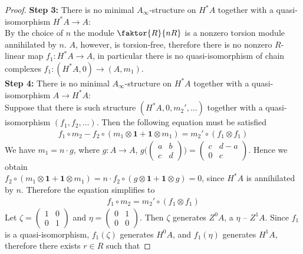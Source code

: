 \documentclass[a4paper, 12pt, openany, fleqn]{amsart}
\begin{document}
\begin{proof}
    \smallskip
    \textbf{Step 3:} There is no minimal $A_\infty$-structure on $H^*A$ together with a quasi-isomorphism $H^*A\longrightarrow A$:\\
    By the choice of $n$ the module $\faktor{R}{nR}$ is a nonzero torsion module annihilated by $n$. $A$, however, is torsion-free, therefore there is no nonzero $R$-linear map $f_1:H^*A\longrightarrow A$, in particular there is no quasi-isomorphism of chain complexes $f_1:(H^*A,0)\longrightarrow (A, m_1)$.\\

    \smallskip
    \textbf{Step 4:} There is no minimal $A_\infty$-structure on $H^*A$ together with a quasi-isomorphism $A\longrightarrow H^*A$:\\
    Suppose that there is such structure $(H^*A,0,m_2',\dots)$ together with a quasi-isomorphism $(f_1,f_2,\dots)$. Then the following equation must be satisfied
    \begin{align*}
        f_1\circ m_2 - f_2\circ(m_1\otimes\mathbf{1}+\mathbf{1}\otimes m_1) = m_2'\circ (f_1\otimes f_1)
    \end{align*}
    We have $m_1 = n\cdot g$, where $g:A\longrightarrow A$, $g\Biggl(\begin{pmatrix}
        a & b\\
        c & d
    \end{pmatrix}\Biggl) = \begin{pmatrix}
        c & d-a\\
        0 & c
    \end{pmatrix}$. Hence we obtain\\ $f_2\circ(m_1\otimes\mathbf{1}+\mathbf{1}\otimes m_1) = n\cdot f_2\circ(g\otimes\mathbf{1}+\mathbf{1}\otimes g) = 0$, since $H^*A$ is annihilated by $n$. Therefore the equation simplifies to
    \begin{align*}
        f_1\circ m_2 = m_2'\circ (f_1\otimes f_1)
    \end{align*}
    Let $\zeta = \begin{pmatrix}
        1 & 0\\
        0 & 1
    \end{pmatrix}$ and $\eta = \begin{pmatrix}
        0 & 1\\
        0 & 0
    \end{pmatrix}$. Then $\zeta$ generates $Z^0A$, a $\eta$ -- $Z^1A$. Since $f_1$ is a quasi-isomorphism, $f_1(\zeta)$ generates $H^0A$, and $f_1(\eta)$ generates $H^1A$, therefore there exists $r\in R$ such that

\end{proof}
\end{document}
